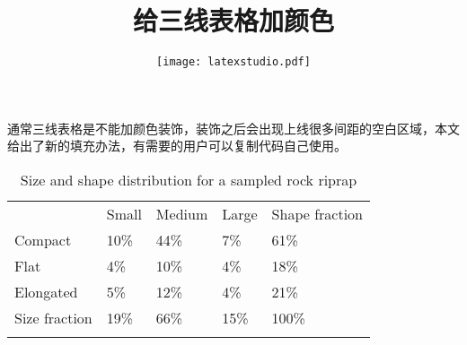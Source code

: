\documentclass[fontset=none]{ctexart}
\title{\bfseries 给三线表格加颜色}
\author{\texttt{[image: latexstudio.pdf]}}
\newcommand{\headcol}{\rowcolor{tableheadcolor}} %
\newcommand{\rowcol}{\rowcolor{tablerowcolor}} %
\newcommand{\topline}{\arrayrulecolor{black}\specialrule{0.1em}{\abovetopsep}{0pt}%
	\arrayrulecolor{tableheadcolor}\specialrule{\belowrulesep}{0pt}{0pt}%
	\arrayrulecolor{black}}
\newcommand{\bottomlinec}{\arrayrulecolor{tablerowcolor}\specialrule{\aboverulesep}{0pt}{0pt}%
	\arrayrulecolor{black}\specialrule{\heavyrulewidth}{0pt}{\belowbottomsep}}%
\newcommand{\rowmidlineHR}{\arrayrulecolor{tableheadcolor}
	\specialrule{\aboverulesep}{0pt}{0pt}%
	\arrayrulecolor{black}\specialrule{\lightrulewidth}{0pt}{0pt}%
	\arrayrulecolor{tablerowcolor}\specialrule{\belowrulesep}{0pt}{0pt}%
	\arrayrulecolor{black}}
\newcommand{\rowmidlineG}{\arrayrulecolor{tablerowcolor}%
	\specialrule{\aboverulesep}{0pt}{0pt}%
	\arrayrulecolor{blcolor}\specialrule{\lightrulewidth}{0pt}{0pt}%
	\arrayrulecolor{tablerowcolor}\specialrule{\belowrulesep}{0pt}{0pt}%
	\arrayrulecolor{black}}
\begin{document}
	\maketitle
	\large
	
	通常三线表格是不能加颜色装饰，装饰之后会出现上线很多间距的空白区域，本文给出了新的填充办法，有需要的用户可以复制代码自己使用。
	\begin{table} [htpb]
		\centering 
		\centering
		\caption{Size and shape distribution for a sampled rock riprap}
		\label{tab:size_shape}
		\begin{tabular} { p{}  p{} p{} p{} p{}  }
			\topline
			\headcol & Small  &  Medium &  Large & Shape fraction \\
			\rowmidlineHR  %
			\rowcol Compact    & 10\% &  44\% & 7\% & 61\% \\
			\rowcol Flat       & 4\%  &  10\% & 4\% & 18\% \\
			\rowcol Elongated  & 5\%  &  12\% & 4\% & 21\% \\
			\rowmidlineG %
			\rowcol Size fraction  & 19\% & 66\% & 15\% & 100\% \\
			\bottomlinec
		\end{tabular}
	\end{table}
\end{document}
